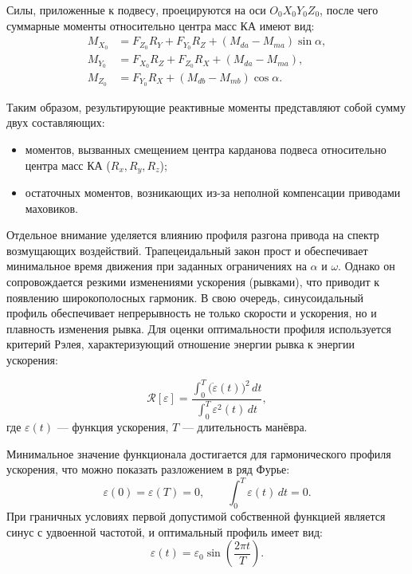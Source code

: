 Силы, приложенные к подвесу, проецируются на оси $O_0X_0Y_0Z_0$, после чего суммарные моменты относительно центра масс КА имеют вид:
\begin{equation*}
	\begin{aligned}
		M_{X_0} &= F_{Z_0}R_Y + F_{Y_0}R_Z + (M_{da}-M_{ma})\sin\alpha, \\
		M_{Y_0} &= F_{X_0}R_Z + F_{Z_0}R_X + (M_{da}-M_{ma}), \\
		M_{Z_0} &= F_{Y_0}R_X + (M_{db}-M_{mb})\cos\alpha.
	\end{aligned}
\end{equation*}

Таким образом, результирующие реактивные моменты представляют собой сумму двух составляющих: 
\begin{itemize}
	\item моментов, вызванных смещением центра карданова подвеса относительно центра масс КА ($R_x, R_y, R_z$);
	\item остаточных моментов, возникающих из-за неполной компенсации приводами маховиков.
\end{itemize}


Отдельное внимание уделяется влиянию профиля разгона привода на спектр возмущающих воздействий. Трапецеидальный закон прост и обеспечивает минимальное время движения  при заданных ограничениях на $\alpha$ и $\omega$. Однако он сопровождается резкими изменениями ускорения (рывками), что приводит к появлению широкополосных гармоник. В свою очередь, синусоидальный профиль обеспечивает непрерывность не только скорости и ускорения, но и плавность изменения рывка. 
Для оценки оптимальности профиля используется критерий Рэлея, характеризующий отношение энергии рывка к энергии ускорения:

\begin{equation*}
	\label{eq:relay}
	\mathcal{R}[\varepsilon] =
	\frac{\displaystyle \int_{0}^{T} \bigl(\dot{\varepsilon}(t)\bigr)^{2}\,dt}
	{\displaystyle \int_{0}^{T} \varepsilon^{2}(t)\,dt},
\end{equation*}
где $\varepsilon(t)$ --- функция ускорения, $T$ --- длительность манёвра.

Минимальное значение функционала достигается для гармонического профиля ускорения, что можно показать разложением в ряд Фурье:
\begin{equation*}
	\varepsilon(0) = \varepsilon(T) = 0, 
	\qquad 
	\int_{0}^{T} \varepsilon(t)\,dt = 0.
\end{equation*}
При граничных условиях первой допустимой собственной функцией является синус с удвоенной частотой, и оптимальный профиль имеет вид:
\begin{equation*}
	\varepsilon(t) = \varepsilon_0 \sin\!\left(\frac{2\pi t}{T}\right).
\end{equation*}


